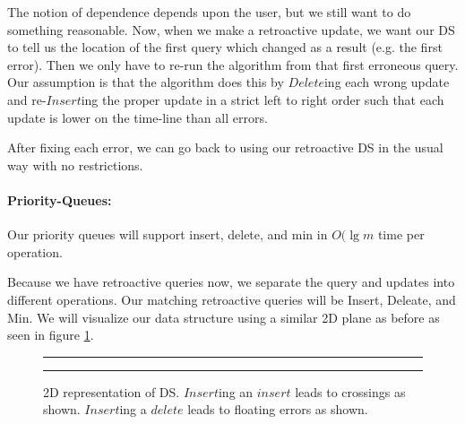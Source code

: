 \documentclass[11pt]{article}
\begin{document}
The notion of dependence depends upon the user, but we still want to do something reasonable.  Now, when we make a retroactive update, we want our DS to tell us the location of the first query which changed as a result (e.g. the first error).  Then we only have to re-run the algorithm from that first erroneous query.  Our assumption is that the algorithm does this by $Delete$ing each wrong update and re-$Insert$ing the proper update in a strict left to right order such that each update is lower on the time-line than all errors.

After fixing each error, we can go back to using our retroactive DS in the usual way with no restrictions.

\paragraph{Priority-Queues:} Our priority queues will support insert, delete, and min in $O(\lg m$ time per operation.

Because we have retroactive queries now, we separate the query and updates into different operations.  Our matching retroactive queries will be Insert, Deleate, and Min.  We will visualize our data structure using a similar 2D plane as before as seen in figure \ref{fig-nrpq}.

\begin{figure}[ht]
	\rule{\textwidth}{0.005in}
  \begin{center}
  \end{center}

  \caption{\small 2D representation of DS.  $Insert$ing an $insert$ leads to crossings as shown.  $Insert$ing a $delete$ leads to floating errors as shown.}
  \label{fig-nrpq}
	\rule{\textwidth}{0.005in}
\end{figure}
\end{document}

